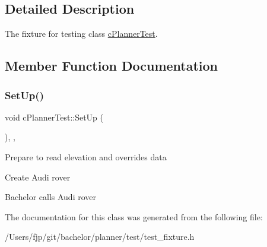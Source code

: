 \subsection{Detailed Description}
The fixture for testing class \mbox{\hyperlink{classc_planner_test}{c\+Planner\+Test}}. 

\subsection{Member Function Documentation}
\mbox{\label{classc_planner_test_a88ad8b0e63c66a9d94c7606aa67ef20d}} 
\subsubsection{\texorpdfstring{Set\+Up()}{SetUp()}}
{\footnotesize\ttfamily void c\+Planner\+Test\+::\+Set\+Up (\begin{DoxyParamCaption}{ }\end{DoxyParamCaption})\hspace{0.3cm}{\ttfamily [inline]}, {\ttfamily [override]}, {\ttfamily [protected]}}

Prepare to read elevation and overrides data

Create Audi rover

Bachelor calls Audi rover 

The documentation for this class was generated from the following file\+:\begin{DoxyCompactItemize}
\item 
/\+Users/fjp/git/bachelor/planner/test/test\+\_\+fixture.\+h\end{DoxyCompactItemize}
